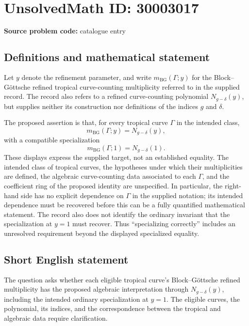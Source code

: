 \documentclass[11pt]{article}
\begin{document}
\section*{UnsolvedMath ID: 30003017}
\textbf{Source problem code:} catalogue entry
\subsection{Definitions and mathematical statement}
Let \(y\) denote the refinement parameter, and write \(m_{\mathrm{BG}}(\Gamma;y)\) for the Block--G\"ottsche refined tropical curve-counting multiplicity referred to in the supplied record. The record also refers to a refined curve-counting polynomial \(N_{g-\delta}(y)\), but supplies neither its construction nor definitions of the indices \(g\) and \(\delta\).

The proposed assertion is that, for every tropical curve \(\Gamma\) in the intended class,
\[
 m_{\mathrm{BG}}(\Gamma;y)=N_{g-\delta}(y),
\]
with a compatible specialization
\[
 m_{\mathrm{BG}}(\Gamma;1)=N_{g-\delta}(1).
\]
These displays express the supplied target, not an established equality. The intended class of tropical curves, the hypotheses under which their multiplicities are defined, the algebraic curve-counting data associated to each \(\Gamma\), and the coefficient ring of the proposed identity are unspecified. In particular, the right-hand side has no explicit dependence on \(\Gamma\) in the supplied notation; its intended dependence must be recovered before this can be a fully quantified mathematical statement. The record also does not identify the ordinary invariant that the specialization at \(y=1\) must recover. Thus ``specializing correctly'' includes an unresolved requirement beyond the displayed specialized equality.
\subsection{Short English statement}
The question asks whether each eligible tropical curve's Block--G\"ottsche refined multiplicity has the proposed algebraic interpretation through \(N_{g-\delta}(y)\), including the intended ordinary specialization at \(y=1\). The eligible curves, the polynomial, its indices, and the correspondence between the tropical and algebraic data require clarification.
\end{document}
